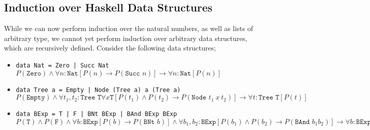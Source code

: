 \documentclass[a4paper, 12pt]{article}
\begin{document}
        \subsection*{Induction over Haskell Data Structures}
            While we can now perform induction over the natural numbers, as well as lists of arbitrary type, we cannot yet perform induction over arbitrary data structures, which are recursively defined. Consider the following data structures;
            \begin{itemize}
                \itemsep0em
                \item \texttt{data Nat = Zero | Succ Nat}
                    \subitem $P(\texttt{Zero}) \land \forall n : \texttt{Nat} [P(n) \rightarrow P(\texttt{Succ } n)] \rightarrow \forall n : \texttt{Nat} [P(n)]$
                \item \texttt{data Tree a = Empty | Node (Tree a) a (Tree a)}
                    \subitem $P(\texttt{Empty}) \land \forall t_1, t_2 : \texttt{Tree T} \forall x \texttt{T} [P(t_1) \land P(t_2) \rightarrow P(\texttt{Node }t_1\ x\ t_2)] \rightarrow \forall t : \texttt{Tree T} [P(t)]$
                \item \texttt{data BExp = T | F | BNt BExp | BAnd BExp BExp}
                    \subitem $P(\texttt{T}) \land P(\texttt{F}) \land \forall b : \texttt{BExp} [P(b) \rightarrow P(\texttt{BNt } b)] \land \forall b_1, b_2 : \texttt{BExp} [P(b_1) \land P(b_2) \rightarrow P(\texttt{BAnd } b_1 b_2)] \rightarrow \forall b : \texttt{BExp} [P(b)]$
            \end{itemize}
\end{document}
